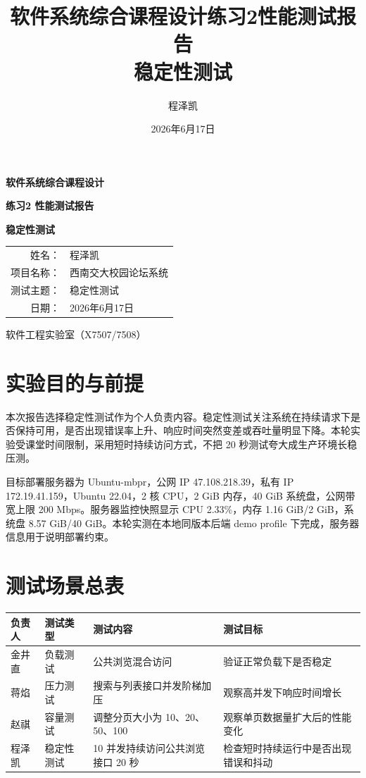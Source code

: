 \documentclass[UTF8,a4paper,12pt]{ctexart}
\title{软件系统综合课程设计练习2性能测试报告\\稳定性测试}
\author{程泽凯}
\date{2026年6月17日}
\begin{document}
\begin{titlepage}
\centering
\vspace*{2.2cm}
{\bfseries 软件系统综合课程设计\par}
\vspace{0.5cm}
{\bfseries 练习2 性能测试报告\par}
\vspace{1.1cm}
{\bfseries 稳定性测试\par}
\vfill
\begin{tabular}{rl}
姓名： & 程泽凯\\[0.4cm]
项目名称： & 西南交大校园论坛系统\\[0.4cm]
测试主题： & 稳定性测试\\[0.4cm]
日期： & 2026年6月17日
\end{tabular}
\vfill
{\large 软件工程实验室（X7507/7508）\par}
\end{titlepage}
\setcounter{page}{1}

\section{实验目的与前提}
本次报告选择稳定性测试作为个人负责内容。稳定性测试关注系统在持续请求下是否保持可用，是否出现错误率上升、响应时间突然变差或吞吐量明显下降。本轮实验受课堂时间限制，采用短时持续访问方式，不把 20 秒测试夸大成生产环境长稳压测。

目标部署服务器为 Ubuntu-mbpr，公网 IP 47.108.218.39，私有 IP 172.19.41.159，Ubuntu 22.04，2 核 CPU，2 GiB 内存，40 GiB 系统盘，公网带宽上限 200 Mbps。服务器监控快照显示 CPU 2.33\%，内存 1.16 GiB/2 GiB，系统盘 8.57 GiB/40 GiB。本轮实测在本地同版本后端 demo profile 下完成，服务器信息用于说明部署约束。

\section{测试场景总表}
\begin{longtable}{P{2.3cm}P{2.4cm}P{5.0cm}P{4.5cm}}
\toprule
负责人 & 测试类型 & 测试内容 & 测试目标\\
\midrule
金井直 & 负载测试 & 公共浏览混合访问 & 验证正常负载下是否稳定\\
蒋焰 & 压力测试 & 搜索与列表接口并发阶梯加压 & 观察高并发下响应时间增长\\
赵祺 & 容量测试 & 调整分页大小为 10、20、50、100 & 观察单页数据量扩大后的性能变化\\
程泽凯 & 稳定性测试 & 10 并发持续访问公共浏览接口 20 秒 & 检查短时持续运行中是否出现错误和抖动\\
\bottomrule
\end{longtable}
\end{document}
